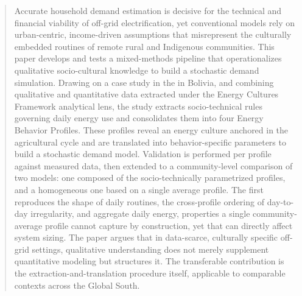 \documentclass[final,3p,times,onecolumn]{elsarticle}
\begin{document}
\begin{frontmatter}


\author[inst3]{Jaime Zambrana}
\author[inst1]{José Espinoza}
\author[inst1]{Sergio Balderrama}
\author[inst2]{Silvain Quoilin}

\begin{abstract}
Accurate household demand estimation is decisive for the technical and financial viability of off-grid electrification, yet conventional models rely on urban-centric, income-driven assumptions that misrepresent the culturally embedded routines of remote rural and Indigenous communities. This paper develops and tests a mixed-methods pipeline that operationalizes qualitative socio-cultural knowledge to build a stochastic demand simulation. Drawing on a case study in the in Bolivia, and combining qualitative and quantitative data extracted under the Energy Cultures Framework analytical lens, the study extracts socio-technical rules governing daily energy use and consolidates them into four Energy Behavior Profiles. These profiles reveal an energy culture anchored in the agricultural cycle and are translated into behavior-specific parameters to build a stochastic demand model. Validation is performed per profile against measured data, then extended to a community-level comparison of two models: one composed of the socio-technically parametrized profiles, and a homogeneous one based on a single average profile. The first reproduces the shape of daily routines, the cross-profile ordering of day-to-day irregularity, and aggregate daily energy, properties a single community-average profile cannot capture by construction, yet that can directly affect system sizing. The paper argues that in data-scarce, culturally specific off-grid settings, qualitative understanding does not merely supplement quantitative modeling but structures it. The transferable contribution is the extraction-and-translation procedure itself, applicable to comparable contexts across the Global South.
\end{abstract}


\end{frontmatter}
\end{document}
